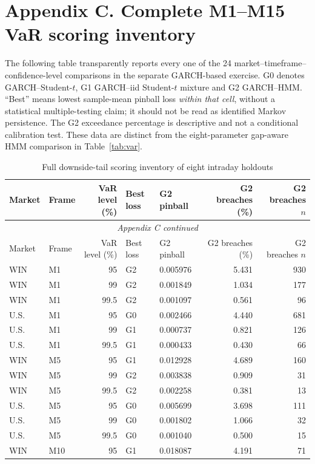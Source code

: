 \documentclass[11pt,a4paper]{article}
\begin{document}
\section*{Appendix C. Complete M1--M15 VaR scoring inventory}\label{app:intradayvar}
The following table transparently reports every one of the 24 market--timeframe--confidence-level comparisons in the separate GARCH-based exercise. G0 denotes GARCH--Student-$t$, G1 GARCH--iid Student-$t$ mixture and G2 GARCH--HMM. ``Best'' means lowest sample-mean pinball loss \emph{within that cell}, without a statistical multiple-testing claim; it should not be read as identified Markov persistence. The G2 exceedance percentage is descriptive and not a conditional calibration test. These data are distinct from the eight-parameter gap-aware HMM comparison in Table~\ref{tab:var}.
\begin{longtable}{llrllrr}
\caption{Full downside-tail scoring inventory of eight intraday holdouts}\label{tab:all8var}\\
\toprule Market & Frame & VaR level (\%) & Best loss & G2 pinball & G2 breaches (\%) & G2 breaches $n$ \\\midrule
\endfirsthead
\multicolumn{7}{c}{\emph{Appendix C continued}}\\\toprule Market & Frame & VaR level (\%) & Best loss & G2 pinball & G2 breaches (\%) & G2 breaches $n$ \\\midrule
\endhead
WIN & M1 & 95 & G2 & 0.005976 & 5.431 & 930 \\ 
WIN & M1 & 99 & G2 & 0.001849 & 1.034 & 177 \\ 
WIN & M1 & 99.5 & G2 & 0.001097 & 0.561 & 96 \\ 
U.S. & M1 & 95 & G0 & 0.002466 & 4.440 & 681 \\ 
U.S. & M1 & 99 & G1 & 0.000737 & 0.821 & 126 \\ 
U.S. & M1 & 99.5 & G1 & 0.000433 & 0.430 & 66 \\ 
WIN & M5 & 95 & G1 & 0.012928 & 4.689 & 160 \\ 
WIN & M5 & 99 & G2 & 0.003838 & 0.909 & 31 \\ 
WIN & M5 & 99.5 & G2 & 0.002258 & 0.381 & 13 \\ 
U.S. & M5 & 95 & G0 & 0.005699 & 3.698 & 111 \\ 
U.S. & M5 & 99 & G0 & 0.001802 & 1.066 & 32 \\ 
U.S. & M5 & 99.5 & G0 & 0.001040 & 0.500 & 15 \\ 
WIN & M10 & 95 & G1 & 0.018087 & 4.191 & 71 \\ 

\end{longtable}
\end{document}
